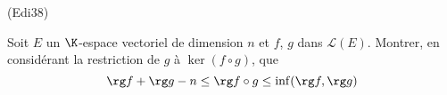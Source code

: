 \begin{tiny}(Edi38)\end{tiny} Soit $E$ un $\K$-espace vectoriel de dimension $n$ et $f$, $g$ dans $\mathcal{L}(E)$. Montrer, en considérant la restriction de $g$ à $\ker(f\circ g)$, que
\begin{displaymath}
  \rg f + \rg g - n \leq \rg f\circ g \leq \inf(\rg f , \rg g)
\end{displaymath}
